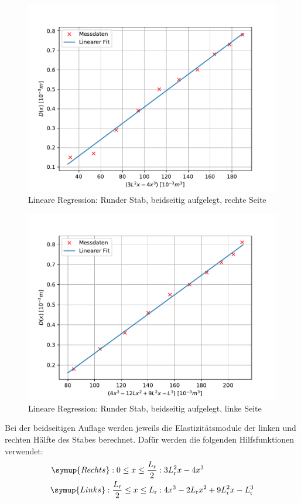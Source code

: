 \begin{figure}[h!]
   \centering
   \includegraphics[width=0.9\linewidth]{beidseitig_rechts.pdf}
   \caption{Lineare Regression: Runder Stab, beidseitig aufgelegt, rechte Seite}
   \label{fig:beidseitig_rechts}
   \end{figure}
   
\begin{figure}[h!]
   \centering
   \includegraphics[width=0.9\linewidth]{beidseitig_links.pdf}
   \caption{Lineare Regression: Runder Stab, beidseitig aufgelegt, linke Seite}
   \label{fig:beidseitig_links}
   \end{figure}
   
Bei der beidseitigen Auflage werden jeweils die Elastizitätsmodule der linken und rechten Hälfte des Stabes berechnet.
Dafür werden die folgenden Hilfsfunktionen \cite[5,6]{anleitung103} verwendet:
\begin{equation*}
\begin{aligned}
\symup{Rechts}: 0 \leq x \leq \frac{L_{\text{r}}}{2}&: 3L_{\text{r}}^2x - 4x^3 \\
\symup{Links}: \frac{L_{\text{r}}}{2} \leq x \leq L_{\text{r}}&: 4x^3 - 2L_{\text{r}}x^2 + 9L_{\text{r}}^2x - L_{\text{r}}^3
\end{aligned}
\end{equation*}

